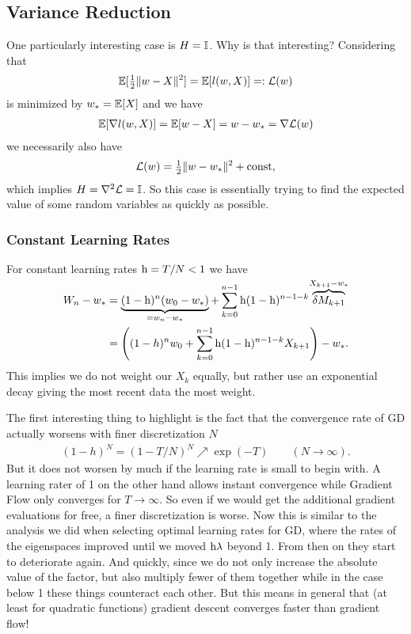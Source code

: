 \subsection{Variance Reduction}\label{subsec: variance reduction}

One particularly interesting case is \(H=\mathbb{I}\). Why is that interesting?
Considering that
\begin{align*}
	\mathbb{E}[\tfrac12\|w-X\|^2]=\mathbb{E}[l(w,X)]=:\mathcal{L}(w)
\end{align*}
is minimized by \(w_*=\mathbb{E}[X]\) and we have
\begin{align*}
	\mathbb{E}[\nabla l(w,X)]
	=\mathbb{E}[w-X]=w- w_*=\nabla\mathcal{L}(w)
\end{align*}
we necessarily also have
\begin{align*}
	\mathcal{L}(w) = \tfrac12\|w-w_*\|^2 + \text{const},
\end{align*}
which implies \(H=\nabla^2\mathcal{L}=\mathbb{I}\). So this case is essentially
trying to find the expected value of some random variables as quickly as
possible.

\subsubsection{Constant Learning Rates}

For constant learning rates \(\text{h}=T/N<1\) we have
\begin{align*}
	W_n - w_*
	&= \underbrace{(1-\text{h})^n(w_0 -w_*)}_{=w_n-w_*}
	+ \sum_{k=0}^{n-1}\text{h}(1-\text{h})^{n-1-k}
	\smash{\overbrace{\delta M_{k+1}}^{X_{k+1}-w_*}}\\
	&= \left((1-h)^nw_0 + \sum_{k=0}^{n-1}\text{h}(1-\text{h})^{n-1-k}X_{k+1}\right)-w_*.
\end{align*}
This implies we do not weight our \(X_k\) equally, but rather use an
exponential decay giving the most recent data the most weight.

The first interesting thing to highlight is the fact that the convergence
rate of GD actually worsens with finer discretization \(N\)
\begin{align*}
	(1-h)^N = (1-T/N)^N \nearrow \exp(-T) \qquad (N\to\infty).
\end{align*}
But it does not worsen by much if the learning rate is small to begin with. A
learning rater of 1 on the other hand allows instant convergence while Gradient
Flow only converges for \(T\to\infty\). So even if we would get the additional
gradient evaluations for free, a finer discretization is worse. Now this is
similar to the analysis we did when selecting optimal learning rates for GD,
where the rates of the eigenspaces improved until we moved \(\text{h}\lambda\)
beyond 1. From then on they start to deteriorate again. And quickly, since we
do not only increase the absolute value of the factor, but also multiply fewer 
of them together while in the case below 1 these things counteract each other.
But this means in general that (at least for quadratic functions) gradient
descent converges faster than gradient flow!

